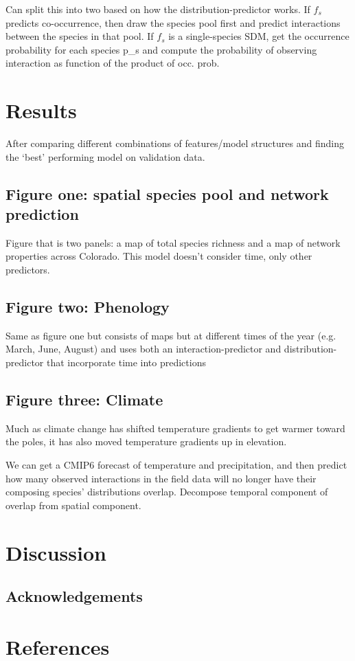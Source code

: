 \documentclass[11pt]{article}
\begin{document}
Can split this into two based on how the distribution-predictor works.
If \(f_s\) predicts co-occurrence, then draw the species pool first and
predict interactions between the species in that pool. If \(f_s\) is a
single-species SDM, get the occurrence probability for each species p\_s
and compute the probability of observing interaction as function of the
product of occ. prob.

\hypertarget{results}{%
\section{Results}\label{results}}

After comparing different combinations of features/model structures and
finding the `best' performing model on validation data.

\hypertarget{figure-one-spatial-species-pool-and-network-prediction}{%
\subsection{Figure one: spatial species pool and network
prediction}\label{figure-one-spatial-species-pool-and-network-prediction}}

Figure that is two panels: a map of total species richness and a map of
network properties across Colorado. This model doesn't consider time,
only other predictors.

\hypertarget{figure-two-phenology}{%
\subsection{Figure two: Phenology}\label{figure-two-phenology}}

Same as figure one but consists of maps but at different times of the
year (e.g. March, June, August) and uses both an interaction-predictor
and distribution-predictor that incorporate time into predictions

\hypertarget{figure-three-climate}{%
\subsection{Figure three: Climate}\label{figure-three-climate}}

Much as climate change has shifted temperature gradients to get warmer
toward the poles, it has also moved temperature gradients up in
elevation.

We can get a CMIP6 forecast of temperature and precipitation, and then
predict how many observed interactions in the field data will no longer
have their composing species' distributions overlap. Decompose temporal
component of overlap from spatial component.

\hypertarget{discussion}{%
\section{Discussion}\label{discussion}}

\hypertarget{acknowledgements}{%
\subsection{Acknowledgements}\label{acknowledgements}}

\hypertarget{references}{%
\section{References}\label{references}}
\end{document}
